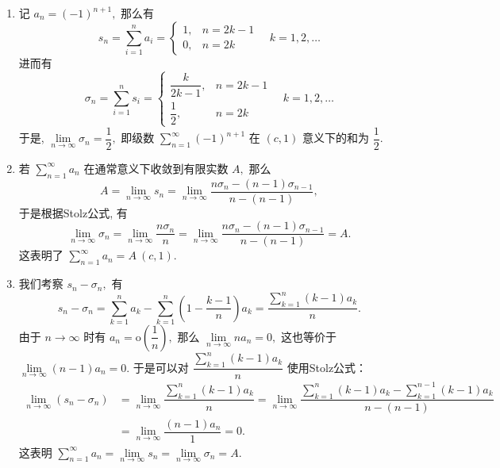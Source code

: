 \begin{solution}
\begin{enumerate}
\item 记 $a_n = (-1)^{n+1},$ 那么有
\[s_n = \sum\limits_{i=1}^n a_i = \begin{cases}
1, & n = 2k - 1\\
0, & n = 2k
\end{cases} \quad k = 1, 2, \dots\]
进而有
\[\sigma_n = \sum\limits_{i=1}^n s_i = \begin{cases}
\dfrac{k}{2k - 1}, & n = 2k - 1\\
\dfrac{1}{2}, & n = 2k
\end{cases} \quad k = 1, 2, \dots\]
于是, $\lim\limits_{n \to \infty} \sigma_n = \dfrac{1}{2},$ 即级数 $\sum\limits_{n=1}^{\infty} (-1)^{n+1}$ 在 $(c, 1)$ 意义下的和为 $\dfrac{1}{2}.$
\item 若 $\sum\limits_{n=1}^{\infty} a_n$ 在通常意义下收敛到有限实数 $A,$ 那么
\[A = \lim\limits_{n \to \infty} s_n = \lim\limits_{n \to \infty} \dfrac{n\sigma_n - (n-1)\sigma_{n-1}}{n - (n-1)}, \]
于是根据Stolz公式, 有
\[\lim\limits_{n \to \infty} \sigma_n = \lim\limits_{n \to \infty} \dfrac{n\sigma_n}{n} = \lim\limits_{n \to \infty} \dfrac{n\sigma_n - (n-1)\sigma_{n-1}}{n - (n-1)} = A.\]
这表明了 $\sum\limits_{n=1}^{\infty} a_n = A~(c, 1).$
\item 我们考察 $s_n - \sigma_n,$ 有
\[s_n - \sigma_n = \sum\limits_{k=1}^n a_k - \sum\limits_{k=1}^n \left( 1 - \dfrac{k-1}{n} \right) a_k = \dfrac{\sum\limits_{k=1}^n (k-1)a_k}{n}.\]
由于 $n \to \infty$ 时有 $a_n = \mathrm{o}\left( \dfrac{1}{n} \right),$ 那么 $\lim\limits_{n \to \infty} n a_n = 0,$ 这也等价于 $\lim\limits_{n \to \infty} (n - 1) a_n = 0.$ 于是可以对 $\dfrac{\sum\limits_{k=1}^n (k-1)a_k}{n}$ 使用Stolz公式：
\begin{align*}
\lim\limits_{n \to \infty} (s_n - \sigma_n) & = \lim\limits_{n \to \infty} \dfrac{\sum\limits_{k=1}^n (k-1)a_k}{n} = \lim\limits_{n \to \infty} \dfrac{\sum\limits_{k=1}^n (k-1)a_k - \sum\limits_{k=1}^{n-1} (k-1)a_k}{n - (n-1)} \\
& = \lim\limits_{n \to \infty} \dfrac{(n-1)a_n}{1} = 0.
\end{align*}
这表明 $\sum\limits_{n=1}^{\infty} a_n = \lim\limits_{n \to \infty} s_n = \lim\limits_{n \to \infty} \sigma_n = A.$
\end{enumerate}
\end{solution}


